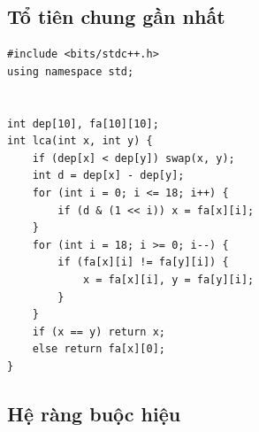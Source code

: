 \documentclass[11pt]{article}
\begin{document}
\subsection{Tổ tiên chung gần nhất}

\begingroup
\footnotesize
\begin{verbatim}
#include <bits/stdc++.h>
using namespace std;


int dep[10], fa[10][10];
int lca(int x, int y) {
    if (dep[x] < dep[y]) swap(x, y);
    int d = dep[x] - dep[y];
    for (int i = 0; i <= 18; i++) {
        if (d & (1 << i)) x = fa[x][i];
    }
    for (int i = 18; i >= 0; i--) {
        if (fa[x][i] != fa[y][i]) {
            x = fa[x][i], y = fa[y][i];
        }
    }
    if (x == y) return x;
    else return fa[x][0];
}
\end{verbatim}
\endgroup

\subsection{Hệ ràng buộc hiệu}
\end{document}
